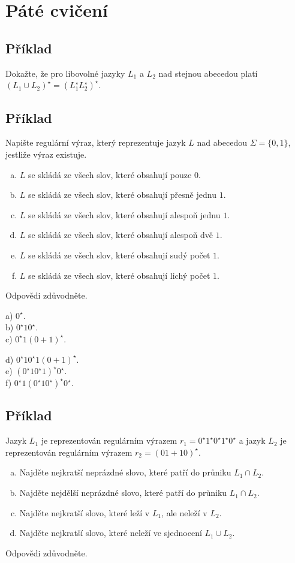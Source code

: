 \section{Páté cvičení}

\subsection{Příklad}
Dokažte, že pro libovolné jazyky $L_1$ a $L_2$ nad stejnou abecedou platí $(L_1 \cup L_2)^\star = (L_1^\star L_2^\star)^\star$.

\subsection{Příklad}
Napište regulární výraz, který reprezentuje jazyk $L$ nad abecedou $\Sigma = \{0,1\}$, jestliže výraz existuje.
\begin{enumerate}[a), noitemsep]
    \item $L$ se skládá ze všech slov, které obsahují pouze $0$.
    \item $L$ se skládá ze všech slov, které obsahují přesně jednu $1$.
    \item $L$ se skládá ze všech slov, které obsahují alespoň jednu $1$.
    \item $L$ se skládá ze všech slov, které obsahují alespoň dvě $1$.
    \item $L$ se skládá ze všech slov, které obsahují sudý počet $1$.
    \item $L$ se skládá ze všech slov, které obsahují lichý počet $1$.
\end{enumerate}
Odpovědi zdůvodněte.

\begin{multicols}{2}
    a) $0^\star$.\\
    b) $0^\star 1 0^\star$.\\
    c) $0^\star 1 (0+1)^\star$.
\columnbreak

    d) $0^\star 1 0^\star 1 (0+1)^\star$.\\
    e) $(0^\star 1 0^\star 1)^\star 0^\star$.\\
    f) $0^\star 1 (0^\star 1 0^\star)^\star 0^\star$.
\end{multicols}

\subsection{Příklad}
Jazyk $L_1$ je reprezentován regulárním výrazem $r_1 = 0^\star1^\star0^\star1^\star0^\star$ a jazyk $L_2$ je reprezentován 
regulárním výrazem $r_2 = (01 + 10)^\star$.
\begin{enumerate}[a), noitemsep]
    \item Najděte nejkratší neprázdné slovo, které patří do průniku $L_1 \cap L_2$.
    \item Najděte nejdělší neprázdné slovo, které patří do průniku $L_1 \cap L_2$.
    \item Najděte nejkratší slovo, které leží v $L_1$, ale neleží v $L_2$.
    \item Najděte nejkratší slovo, které neleží ve sjednocení $L_1 \cup L_2$.
\end{enumerate}
Odpovědi zdůvodněte.

